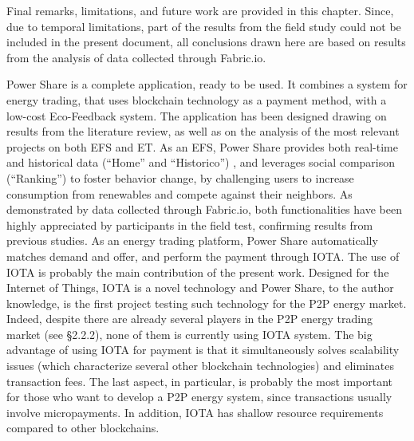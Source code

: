 \cleardoublepage
\label{chap:conclusions}

Final remarks, limitations, and future work are provided in this chapter. Since, due to temporal limitations, part of the results from the field study could not be included in the present document, all conclusions drawn here are based on results from the analysis of data collected through Fabric.io. 
	
	
	
Power Share is a complete application, ready to be used. It combines a system for energy trading, that uses blockchain technology as a payment method, with a low-cost Eco-Feedback system. The application has been designed drawing on results from the literature review, as well as on the analysis of the most relevant projects on both \ac{EFS} and \ac{ET}.
As an \ac{EFS}, Power Share provides both real-time and historical data (“Home” and “Historico”) \cite{Giulio2009}, and leverages social comparison (“Ranking”) \cite{Froehlich2010} to foster behavior change, by challenging users to increase consumption from renewables and compete against their neighbors. As demonstrated by data collected through Fabric.io, both functionalities have been highly appreciated by participants in the field test, confirming results from previous studies.
As an energy trading platform, Power Share automatically matches demand and offer, and perform the payment through IOTA. The use of IOTA is probably the main contribution of the present work. Designed for the Internet of Things, IOTA is a novel technology and Power Share, to the author knowledge, is the first project testing such technology for the P2P energy market. Indeed, despite there are already several players in the P2P energy trading market (see §2.2.2), none of them is currently using IOTA system. The big advantage of using IOTA for payment is that it simultaneously solves scalability issues (which characterize several other blockchain technologies) and eliminates transaction fees. The last aspect, in particular, is probably the most important for those who want to develop a P2P energy system, since transactions usually involve micropayments. In addition, IOTA has shallow resource requirements compared to other blockchains. 



